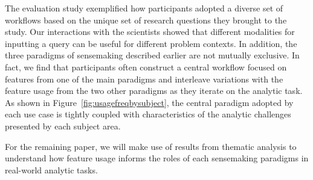 \par The evaluation study exemplified how participants adopted a diverse set of workflows based on the unique set of research questions they brought to the study. Our interactions with the scientists showed that different modalities for inputting a query can be useful for different problem contexts. In addition, the three paradigms of sensemaking described earlier are not mutually exclusive. In fact, we find that participants often construct a central workflow focused on features from one of the main paradigms and interleave variations with the feature usage from the two other paradigms as they iterate on the analytic task. As shown in Figure~\ref{fig:usagefreqbysubject}, the central paradigm adopted by each use case is tightly coupled with characteristics of the analytic challenges presented by each subject area.
\par For the remaining paper, we will make use of results from thematic analysis to understand how feature usage informs the roles of each sensemaking paradigms in real-world analytic tasks.
